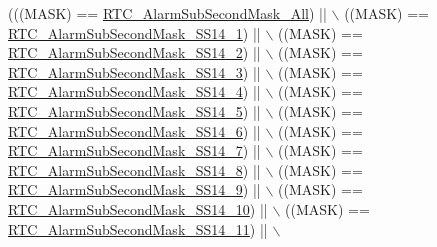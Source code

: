 \begin{DoxyCode}
(((MASK) == \hyperlink{group___r_t_c___alarm___sub___seconds___masks___definitions_ga7ca3d2cc7822e86a0397137400bff1e8}{RTC\_AlarmSubSecondMask\_All}) || \(\backslash\)
                                              ((MASK) == 
      \hyperlink{group___r_t_c___alarm___sub___seconds___masks___definitions_gae7d0420a85eea688e04bbccd27ee5ce9}{RTC\_AlarmSubSecondMask\_SS14\_1}) || \(\backslash\)
                                              ((MASK) == 
      \hyperlink{group___r_t_c___alarm___sub___seconds___masks___definitions_ga9a31704b58e40877680090cca7bfeb29}{RTC\_AlarmSubSecondMask\_SS14\_2}) || \(\backslash\)
                                              ((MASK) == 
      \hyperlink{group___r_t_c___alarm___sub___seconds___masks___definitions_gaa5938e9c92c2467ce5c6fea0b05cb498}{RTC\_AlarmSubSecondMask\_SS14\_3}) || \(\backslash\)
                                              ((MASK) == 
      \hyperlink{group___r_t_c___alarm___sub___seconds___masks___definitions_gadefaba27e57718b2c164d0616e6ca0be}{RTC\_AlarmSubSecondMask\_SS14\_4}) || \(\backslash\)
                                              ((MASK) == 
      \hyperlink{group___r_t_c___alarm___sub___seconds___masks___definitions_ga05e639e8796dd05b70ac3043cd578644}{RTC\_AlarmSubSecondMask\_SS14\_5}) || \(\backslash\)
                                              ((MASK) == 
      \hyperlink{group___r_t_c___alarm___sub___seconds___masks___definitions_gac4105d5f52321db4c5402a7f19e4cd40}{RTC\_AlarmSubSecondMask\_SS14\_6}) || \(\backslash\)
                                              ((MASK) == 
      \hyperlink{group___r_t_c___alarm___sub___seconds___masks___definitions_ga65c2ed26d90ef3fe08cd938a5e7cec90}{RTC\_AlarmSubSecondMask\_SS14\_7}) || \(\backslash\)
                                              ((MASK) == 
      \hyperlink{group___r_t_c___alarm___sub___seconds___masks___definitions_ga9a6d13dc2baaf30007f43d4086b6ccad}{RTC\_AlarmSubSecondMask\_SS14\_8}) || \(\backslash\)
                                              ((MASK) == 
      \hyperlink{group___r_t_c___alarm___sub___seconds___masks___definitions_ga4a8e2fd87578d1357ec8f169766119ec}{RTC\_AlarmSubSecondMask\_SS14\_9}) || \(\backslash\)
                                              ((MASK) == 
      \hyperlink{group___r_t_c___alarm___sub___seconds___masks___definitions_ga5eecab4e9eed9231aed9bf66b0b6efe8}{RTC\_AlarmSubSecondMask\_SS14\_10}) || \(\backslash\)
                                              ((MASK) == 
      \hyperlink{group___r_t_c___alarm___sub___seconds___masks___definitions_gae8a49e83d96a1651c202ccdf30d68f0d}{RTC\_AlarmSubSecondMask\_SS14\_11}) || \(\backslash\)

\end{DoxyCode}
